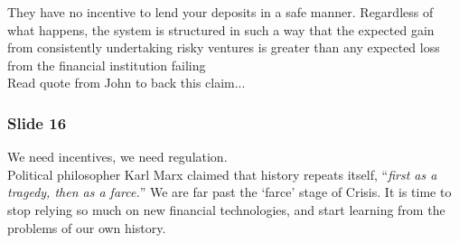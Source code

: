 \documentclass[a4paper, 11pt]{article} %
\begin{document}
They have no incentive to lend your deposits in a safe manner. Regardless of what happens, the system is structured in such a way that the expected gain from consistently undertaking risky ventures is greater than any expected loss from the financial institution failing\\

Read quote from John to back this claim...


\subsubsection*{Slide 16}

We need incentives, we need regulation.\\

Political philosopher Karl Marx claimed that history repeats itself, ``\textit{first as a tragedy, then as a farce.}'' We are far past the `farce' stage of Crisis. It is time to stop relying so much on new financial technologies, and start learning from the problems of our own history.
\end{document}
